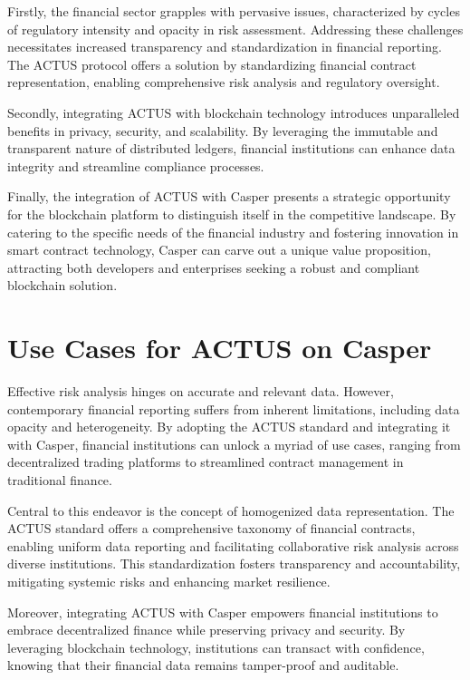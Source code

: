 \documentclass[12pt]{article}
\begin{document}
Firstly, the financial sector grapples with pervasive issues, characterized by
cycles of regulatory intensity and opacity in risk assessment. Addressing these
challenges necessitates increased transparency and standardization in financial
reporting. The ACTUS protocol offers a solution by standardizing financial
contract representation, enabling comprehensive risk analysis and regulatory
oversight.

Secondly, integrating ACTUS with blockchain technology introduces unparalleled
benefits in privacy, security, and scalability. By leveraging the immutable and
transparent nature of distributed ledgers, financial institutions can enhance
data integrity and streamline compliance processes.

Finally, the integration of ACTUS with Casper presents a strategic opportunity
for the blockchain platform to distinguish itself in the competitive landscape.
By catering to the specific needs of the financial industry and fostering
innovation in smart contract technology, Casper can carve out a unique value
proposition, attracting both developers and enterprises seeking a robust and
compliant blockchain solution.

\section{Use Cases for ACTUS on Casper}

Effective risk analysis hinges on accurate and relevant data. However,
contemporary financial reporting suffers from inherent limitations, including
data opacity and heterogeneity. By adopting the ACTUS standard and integrating
it with Casper, financial institutions can unlock a myriad of use cases, ranging
from decentralized trading platforms to streamlined contract management in
traditional finance.

Central to this endeavor is the concept of homogenized data representation. The
ACTUS standard offers a comprehensive taxonomy of financial contracts, enabling
uniform data reporting and facilitating collaborative risk analysis across
diverse institutions. This standardization fosters transparency and
accountability, mitigating systemic risks and enhancing market resilience.

Moreover, integrating ACTUS with Casper empowers financial institutions to
embrace decentralized finance while preserving privacy and security. By
leveraging blockchain technology, institutions can transact with confidence,
knowing that their financial data remains tamper-proof and auditable.
\end{document}
